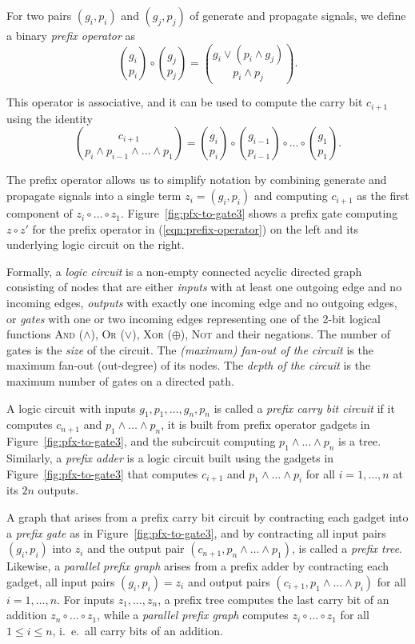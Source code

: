 \documentclass[11pt,final,microtype]{scrartcl}
\theoremstyle{plain}
\theoremstyle{definition}
\theoremstyle{remark}
\newcommand{\tikzfigs}[3]{
  \begin{figure}[!tb]\centering{\resizebox{#2\linewidth}{!}{\begin{tikzpicture}
          
        \end{tikzpicture}}\caption{#1}\label{fig:#3}}\end{figure}}
\begin{document}
For two pairs $(g_i, p_i)$ and $(g_j, p_j)$ of generate and propagate
signals, we define a binary \emph{prefix operator} as
\begin{equation}
{g_i \choose p_i} \circ {g_j \choose p_j} = {g_i \vee (p_i \wedge g_j)
  \choose p_i \wedge p_j}.
\label{eqn:prefix-operator}
\end{equation}

This operator is associative, and it can be used to compute the
carry bit $c_{i+1}$ using the identity
$${c_{i+1} \choose p_i \wedge p_{i-1} \wedge \dots \wedge p_1} = {g_i
  \choose p_i} \circ {g_{i-1} \choose p_{i-1}} \circ \dots \circ {g_1
  \choose p_1}.$$ 

The prefix operator allows us to simplify notation by combining
generate and propagate signals into a single term $z_i= (g_i,p_i)$ and
computing $c_{i+1}$ as the first component of $z_i \circ \dots \circ
z_1$.  Figure~\ref{fig:pfx-to-gate3} shows a prefix gate computing $z
\circ z'$ for the prefix operator in (\ref{eqn:prefix-operator}) on
the left and its underlying logic circuit on the right.

\tikzfigs{Prefix gate and underlying logic circuit}{0.4}{pfx-to-gate3}

Formally, a \emph{logic circuit} is a non-empty connected acyclic
directed graph consisting of nodes that are either \emph{inputs} with
at least one outgoing edge and no incoming edges, \emph{outputs} with
exactly one incoming edge and no outgoing edges, or \emph{gates} with
one or two incoming edges representing one of the 2-bit logical
functions \textsc{And} ($\wedge$), \textsc{Or} ($\vee$), \textsc{Xor}
($\oplus$), \textsc{Not} and their negations.
The number of gates is the \emph{size} of the
circuit. The \emph{(maximum) fan-out of the circuit} is the maximum
fan-out (out-degree) of its nodes. The \emph{depth of the
  circuit} is the maximum number of gates on a directed path.

A logic circuit with inputs $g_1,p_1,\dots,g_n,p_n$ is called 
a \emph{prefix carry bit circuit}  if it  computes  $c_{n+1}$ and $p_1\wedge\dots\wedge p_n$, 
it is built from prefix operator gadgets in Figure~\ref{fig:pfx-to-gate3}, and the subcircuit computing $p_1\wedge\dots\wedge p_n$ is a tree.
Similarly, a \emph{prefix adder}  is a logic circuit built using the gadgets in Figure~\ref{fig:pfx-to-gate3}
that computes  $c_{i+1}$  and $p_1\wedge\dots\wedge p_i$ for all $i=1,\dots,n$ at its $2n$ outputs.


A graph that arises from a prefix carry bit circuit by contracting
each gadget into a \emph{prefix gate} as in
Figure~\ref{fig:pfx-to-gate3}, and by contracting all input pairs
$(g_i,p_i)$ into $z_i$ and the output pair
$(c_{n+1},p_n\wedge\dots\wedge p_1)$, is called a \emph{prefix tree}.
Likewise, a \emph{parallel prefix graph} arises from a prefix adder by
contracting each gadget, all input pairs $(g_i,p_i)=z_i$ and output
pairs $(c_{i+1},p_1\wedge\dots\wedge p_i)$ for all $i = 1,\dots,n$.
For inputs $z_1, \dots, z_n$, a prefix tree computes the last
carry bit of an addition $z_n \circ \dots \circ z_1$, while a
\emph{parallel prefix graph} computes $z_i \circ \dots \circ z_1$ for
all $1 \leq i \leq n$, i.\ e.\ all carry bits of an addition.
\end{document}
